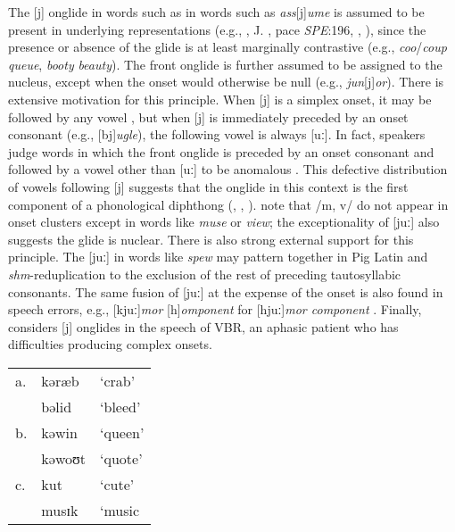 The [j] onglide in words such as in words such as \emph{ass}[j]\emph{ume} is assumed to be present in underlying representations (e.g., \citealt[][278]{Borowsky1986}, J. \citealt{Anderson1988b}, pace \emph{SPE}:196, \citealt[][89]{Halle1985a}, \citealt[][217]{McMahon1990}), since the presence or absence of the glide is at least marginally contrastive (e.g., \emph{coo}/\emph{coup} \alt{} \emph{queue}, \emph{booty} \alt{} \emph{beauty}). The front onglide is further assumed to be assigned to the nucleus, except when the onset would otherwise be null (e.g., \emph{jun}[j]\emph{or}). 
There is extensive motivation for this principle. When [j] is a simplex onset, it may be followed by any vowel \citep[][276]{Borowsky1986}, but when [j] is immediately preceded by an onset consonant (e.g., [bj]\emph{ugle}), the following vowel is always [uː]. In fact, speakers judge words in which the front onglide is preceded by an onset consonant and followed by a vowel other than [uː] to be anomalous \citep{Moreland2009}. This defective distribution of vowels following [j] suggests that the onglide in this context is the first component of a phonological diphthong (\citealp[][232]{Hayes1980}, \citealp[][61f.]{Harris1994}, \citealp{Davis1995}). \citet[][42]{Clements1983} note that /m, v/ do not appear in onset clusters except in words like \emph{muse} or \emph{view}; the exceptionality of [juː] also suggests the glide is nuclear. There is also strong external support for this principle. The [juː] in words like \emph{spew} may pattern together in Pig Latin \citep{Davis1995,Idsardi2005} and \emph{shm}-reduplication \citep{Nevins2003} to the exclusion of the rest of preceding tautosyllabic consonants. The same fusion of [juː] at the expense of the onset is also found in speech errors, e.g., [kjuː]\emph{mor} [h]\emph{omponent} for [hjuː]\emph{mor component} \citep[][130]{Shattuck-Hufnagel1986}. Finally, \citet{Buchwald2005} considers [j] onglides in the speech of VBR, an aphasic patient who has difficulties producing complex onsets. 

\begin{example}

\begin{tabular}{l l l}
a. & kəræb  & `crab'  \\
   & bəlid  & `bleed' \\
b. & kəwin  & `queen' \\
   & kəwoʊt & `quote' \\
c. & kut    & `cute'  \\
   & musɪk  & `music  \\ 
\end{tabular}
\label{VBR}
\end{example}

